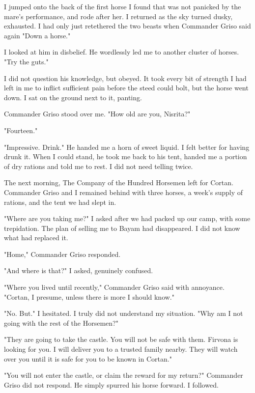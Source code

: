 \documentclass{article}
\begin{document}
I jumped onto the back of the first horse I found that was not panicked by the mare's performance, and rode after her. I returned as the sky turned dusky, exhausted. I had only just retethered the two beasts when Commander Griso said again "Down a horse."

I looked at him in disbelief. He wordlessly led me to another cluster of horses. "Try the guts."

I did not question his knowledge, but obeyed. It took every bit of strength I had left in me to inflict sufficient pain before the steed could bolt, but the horse went down. I sat on the ground next to it, panting. 

Commander Griso stood over me. "How old are you, Nisrita?"

"Fourteen."

"Impressive. Drink." He handed me a horn of sweet liquid. I felt better for having drunk it. When I could stand, he took me back to his tent, handed me a portion of dry rations and told me to rest. I did not need telling twice. 

The next morning, The Company of the Hundred Horsemen left for Cortan. Commander Griso and I remained behind with three horses, a week's supply of rations, and the tent we had slept in.

"Where are you taking me?" I asked after we had packed up our camp, with some trepidation. The plan of selling me to Bayam had disappeared. I did not know what had replaced it.

"Home," Commander Griso responded. 

"And where is that?" I asked, genuinely confused. 

"Where you lived until recently," Commander Griso said with annoyance. "Cortan, I presume, unless there is more I should know."

"No. But." I hesitated. I truly did not understand my situation. "Why am I not going with the rest of the Horsemen?"

"They are going to take the castle. You will not be safe with them. Firvona is looking for you. I will deliver you to a trusted family nearby. They will watch over you until it is safe for you to be known in Cortan."

"You will not enter the castle, or claim the reward for my return?" Commander Griso did not respond. He simply spurred his horse forward. I followed.
\end{document}
